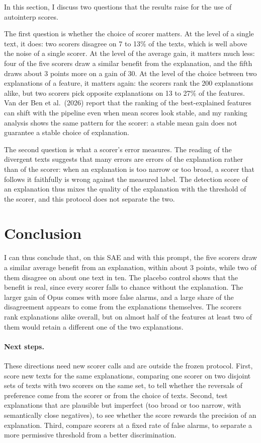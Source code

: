 \documentclass[11pt]{article}
\begin{document}
In this section, I discuss two questions that the results raise for the use of
autointerp scores.

The first question is whether the choice of scorer matters. At the level of a
single text, it does: two scorers disagree on 7 to 13\% of the texts, which is well
above the noise of a single scorer. At the level of the average gain, it matters much
less: four of the five scorers draw a similar benefit from the explanation, and the
fifth draws about 3 points more on a gain of 30. At the level of the choice between two
explanations of a feature, it matters again: the scorers rank the 200 explanations
alike, but two scorers pick opposite explanations on 13 to 27\% of the features. Van
der Ben et al.\ (2026) report that the ranking of the best-explained features can shift
with the pipeline even when mean scores look stable, and my ranking analysis shows
the same pattern for the scorer: a stable mean gain does not guarantee a stable choice of
explanation.

The second question is what a scorer's error measures. The reading of the
divergent texts suggests that many errors are errors of the explanation rather than
of the scorer: when an explanation is too narrow or too broad, a scorer that follows
it faithfully is wrong against the measured label. The detection score of an
explanation thus mixes the quality of the explanation with the threshold of the
scorer, and this protocol does not separate the two.

\section{Conclusion}

I can thus conclude that, on this SAE and with this prompt, the five scorers
draw a similar average benefit from an explanation, within about 3 points, while two of
them disagree on about one text in ten. The placebo control shows that the benefit is
real, since every scorer falls to chance without the explanation. The larger gain of
Opus comes with more false alarms, and a large share of the disagreement appears to
come from the explanations themselves. The scorers rank explanations alike overall,
but on almost half of the features at least two of them would retain a different one
of the two explanations.

\paragraph{Next steps.} These directions need new scorer calls and are outside the
frozen protocol. First, score new texts for the same explanations, comparing one scorer
on two disjoint sets of texts with two scorers on the same set, to tell whether the
reversals of preference come from the scorer or from the choice of texts. Second, test
explanations that are plausible but imperfect (too broad or too narrow, with
semantically close negatives), to see whether the score rewards the precision of an
explanation. Third, compare scorers at a fixed rate of false alarms, to separate a more
permissive threshold from a better discrimination.
\end{document}
